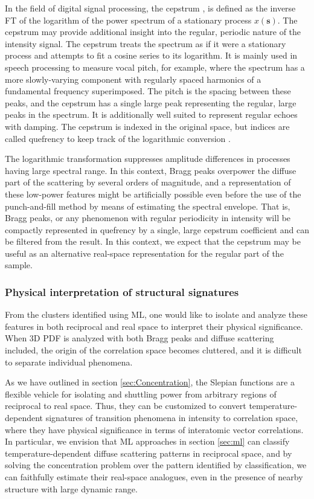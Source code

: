 In the field of digital signal processing, the cepstrum \cite{childers1977}, is
defined as the inverse FT of the logarithm of the power spectrum of a stationary
process $x(\mathbf{s})$. The cepstrum may provide additional insight into the
regular, periodic nature of the intensity signal. The cepstrum treats the spectrum as
if it were a stationary process and attempts to fit a cosine series to its logarithm.
It is mainly used in speech processing to measure vocal pitch, for example, where the
spectrum has a more slowly-varying component with regularly spaced harmonics of a
fundamental frequency superimposed. The pitch is the spacing between these peaks, and
the cepstrum has a single large peak representing the regular, large peaks in the
spectrum. It is additionally well suited to represent regular echoes with damping.
The cepstrum is indexed in the original space, but indices are called quefrency to
keep track of the logarithmic conversion \cite{hansson2009}. 

The logarithmic transformation suppresses amplitude differences in processes having
large spectral range. In this context, Bragg peaks overpower the diffuse part of the
scattering by several orders of magnitude, and a representation of these low-power
features might be artificially possible even before the use of the punch-and-fill
method by means of estimating the spectral envelope. That is, Bragg peaks, or any
phenomenon with regular periodicity in intensity will be compactly represented in
quefrency by a single, large cepstrum coefficient and can be filtered from the
result. In this context, we expect that the cepstrum may be useful as an alternative
real-space representation for the regular part of the sample. 

\subsubsection{Physical interpretation of structural signatures \label{sec:Impact}}

From the clusters identified using ML, one would like to isolate and analyze these
features in both reciprocal and real space to interpret their physical significance.
When 3D PDF is analyzed with both Bragg peaks and diffuse scattering included, the
origin of the correlation space becomes cluttered, and it is difficult to separate
individual phenomena. 

As we have outlined in section \ref{sec:Concentration}, the Slepian functions are a
flexible vehicle for isolating and shuttling power from arbitrary regions of
reciprocal to real space. Thus, they can be customized to convert
temperature-dependent signatures of transition phenomena in intensity to correlation
space, where they have physical significance in terms of interatomic vector
correlations. In particular, we envision that ML approaches in section \ref{sec:ml}
can classify temperature-dependent diffuse scattering patterns in reciprocal space,
and by solving the concentration problem over the pattern identified by
classification, we can faithfully estimate their real-space analogues, even in the
presence of nearby structure with large dynamic range. 

